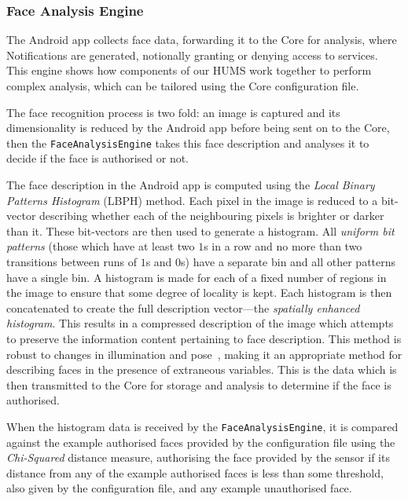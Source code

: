 \documentclass[10pt,a4paper]{article}
\begin{document}
\subsubsection{Face Analysis Engine}
\label{sec:fae}

The Android app collects face data, forwarding it to the Core for analysis, where Notifications are generated, notionally granting or denying access to services. This engine shows how components of our HUMS work together to perform complex analysis, which can be tailored using the Core configuration file.

The face recognition process is two fold: an image is captured and its dimensionality is reduced by the Android app before being sent on to the Core, then the \texttt{FaceAnalysisEngine} takes this face description and analyses it to decide if the face is authorised or not.

The face description in the Android app is computed using the \emph{Local Binary Patterns Histogram} (LBPH) \cite{ahonen2006face} method. Each pixel in the image is reduced to a bit-vector describing whether each of the neighbouring pixels is brighter or darker than it. These bit-vectors are then used to generate a histogram. All \emph{uniform bit patterns} (those which have at least two $1$s in a row and no more than two transitions between runs of $1$s and $0$s) have a separate bin and all other patterns have a single bin. A histogram is made for each of a fixed number of regions in the image to ensure that some degree of locality is kept. Each histogram is then concatenated to create the full description vector---the \emph{spatially enhanced histogram}. This results in a compressed description of the image which attempts to preserve the information content pertaining to face description. This method is robust to changes in illumination and pose~\cite{ahonen2006face}, making it an appropriate method for describing faces in the presence of extraneous variables. This is the data which is then transmitted to the Core for storage and analysis to determine if the face is authorised.

When the histogram data is received by the \texttt{FaceAnalysisEngine}, it is compared against the example authorised faces provided by the configuration file using the \emph{Chi-Squared} distance measure, authorising the face provided by the sensor if its distance from any of the example authorised faces is less than some threshold, also given by the configuration file, and any example unauthorised face.
\end{document}
